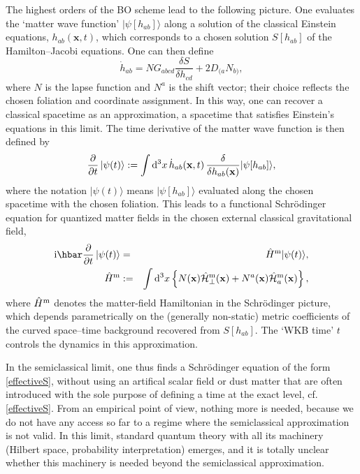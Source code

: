 \documentclass[12pt,a4paper]{article}
\newcommand{\lb}{\label}
\newcommand{\bdm}{\begin{displaymath}}
\newcommand{\edm}{\end{displaymath}}
\newcommand{\D}{{\rm d}}
\newcommand{\I}{{\rm i}}
\begin{document}
The highest orders of the BO scheme lead to the following picture.
One evaluates the `matter wave function' $|\psi[h_{ab}]\rangle$ along a
solution of the classical Einstein equations, $h_{ab}({\mathbf x},t)$,
which corresponds to a chosen solution $S[h_{ab}]$ of the Hamilton--Jacobi
equations.
One can then define 
\bdm
        \dot{h}_{ab}=NG_{abcd}
        \frac{\delta S}{\delta h_{cd}}+
        2D_{(a}{N_{b)}},
\edm
where $N$ is the lapse function and $N^a$ is the shift vector; their
choice reflects the chosen foliation and coordinate assignment. 
In this way, one can recover a classical spacetime as an
approximation, a spacetime that satisfies Einstein's equations in this
limit.  
The time derivative of the matter wave function is then defined by 
\bdm
        \frac{\partial}{\partial t}\,|\psi(t)\rangle:=
        \int \D^3 x \,\dot{h}_{ab}({\bf x},t)\,
        \frac{\delta}{\delta h_{ab}({\bf x})}
        |\psi[h_{ab}]\rangle, 
\edm
where the notation $|\psi(t)\rangle$ means $|\psi [h_{ab}]\rangle$
evaluated along the chosen spacetime with the chosen foliation.
This leads to a functional Schr\"odinger equation for quantized
matter fields in the chosen external classical gravitational field,
        \begin{eqnarray}
\lb{Schrodinger}
        \I\hbar\frac{\partial}{\partial t}\,
        |\psi(t)\rangle &=& \hat{H}{}^{\rm m}|\psi(t)\rangle,\\
        \hat{H}{}^{\rm m} &:=&
        \int \D^3 x \left\{ N({\bf x})
        \hat{\mathcal H}{}^{\rm m}_{\perp}({\bf x})+
        N^a({\bf x})\hat{\mathcal H}{}^{\rm m}_a({\bf x})\right\},
               \end{eqnarray}
where $\hat{H}{}^{\rm m}$ denotes the 
 matter-field Hamiltonian in the Schr\"odinger
picture, which depends parametrically on the (generally non-static) metric
coefficients of the curved space--time background recovered from
$S[h_{ab}]$. The `WKB time' $t$ controls the dynamics in this approximation.

In the semiclassical limit, one thus finds a Schr\"odinger equation of
the form \eqref{effectiveS}, without using an artifical scalar field
or dust matter that are often introduced with the sole purpose of
defining a time at the exact level, cf. \eqref{effectiveS}. From an
empirical point of view, nothing more is 
needed, because we do not have any access so far to a regime where the
semiclassical approximation is not valid. In this limit, standard
quantum theory with all its machinery (Hilbert space, probability
interpretation) emerges, and it is totally unclear whether this
machinery is needed beyond the semiclassical approximation.
\end{document}
